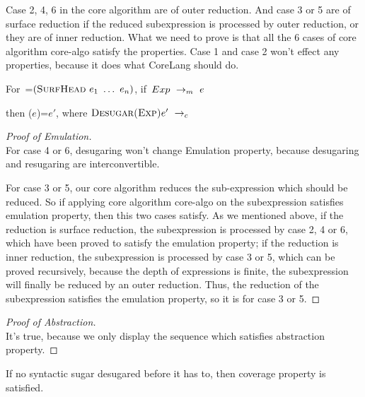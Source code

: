 Case 2, 4, 6 in the core algorithm are of outer reduction. And case 3 or 5 are of surface reduction if the reduced subexpression is processed by outer reduction, or they are of inner reduction.
What we need to prove is that all the 6 cases of core algorithm core-algo satisfy the properties. Case 1 and case 2 won't effect any properties, because it does what CoreLang should do.

\begin{lemma}[Emulation]

For~=$(\mbox{\sc SurfHead}~e_1~\ldots~e_n)$, if~$Exp ~\rightarrow_m~e$

then ($e$)=$e'$,  where $\redc{\m{Desugar(Exp)}{e'}}$
\end{lemma}
\begin{proof}[Proof of Emulation]
\hfill\\
For case 4 or 6, desugaring won't change Emulation property, because desugaring and resugaring are interconvertible.

For case 3 or 5, our core algorithm reduces the sub-expression which should be reduced. So if applying core algorithm core-algo on the subexpression satisfies emulation property, then this two cases satisfy. As we mentioned above, if the reduction is surface reduction, the subexpression is processed by case 2, 4 or 6, which have been proved to satisfy the emulation property; if the reduction is inner reduction, the subexpression is processed by case 3 or 5, which can be proved recursively, because the depth of expressions is finite, the subexpression will finally be reduced by an outer reduction. Thus, the reduction of the subexpression satisfies the emulation property, so it is for case 3 or 5.
\end{proof}

\begin{proof}[Proof of Abstraction]
\hfill\\
It's true, because we only display the sequence which satisfies abstraction property.
\end{proof}

\begin{lemma}
If no syntactic sugar desugared before it has to, then coverage property is satisfied.
\end{lemma}

